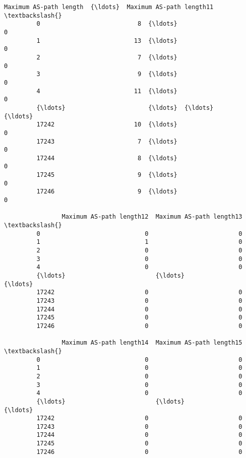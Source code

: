 \documentclass[11pt]{article}
\begin{document}
\begin{Verbatim}[commandchars=\\\{\}]
                Maximum AS-path length  {\ldots}  Maximum AS-path length11  \textbackslash{}
         0                           8  {\ldots}                         0   
         1                          13  {\ldots}                         0   
         2                           7  {\ldots}                         0   
         3                           9  {\ldots}                         0   
         4                          11  {\ldots}                         0   
         {\ldots}                       {\ldots}  {\ldots}                       {\ldots}   
         17242                      10  {\ldots}                         0   
         17243                       7  {\ldots}                         0   
         17244                       8  {\ldots}                         0   
         17245                       9  {\ldots}                         0   
         17246                       9  {\ldots}                         0   
         
                Maximum AS-path length12  Maximum AS-path length13  \textbackslash{}
         0                             0                         0   
         1                             1                         0   
         2                             0                         0   
         3                             0                         0   
         4                             0                         0   
         {\ldots}                         {\ldots}                       {\ldots}   
         17242                         0                         0   
         17243                         0                         0   
         17244                         0                         0   
         17245                         0                         0   
         17246                         0                         0   
         
                Maximum AS-path length14  Maximum AS-path length15  \textbackslash{}
         0                             0                         0   
         1                             0                         0   
         2                             0                         0   
         3                             0                         0   
         4                             0                         0   
         {\ldots}                         {\ldots}                       {\ldots}   
         17242                         0                         0   
         17243                         0                         0   
         17244                         0                         0   
         17245                         0                         0   
         17246                         0                         0   
         

\end{Verbatim}
\end{document}
